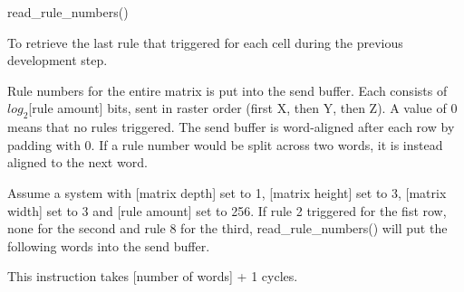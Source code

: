 

\format
read\_rule\_numbers()

\purpose

To retrieve the last rule that triggered for each cell during the previous development step.

\description

Rule numbers for the entire matrix is put into the send buffer.
Each consists of $log_2$[rule amount] bits, sent in raster order (first X, then Y, then Z).
A value of 0 means that no rules triggered.
The send buffer is word-aligned after each row by padding with 0.
If a rule number would be split across two words, it is instead aligned to the next word.

\example

Assume a system with [matrix depth] set to 1, [matrix height] set to 3, [matrix width] set to 3 and [rule amount] set to 256.
If rule 2 triggered for the fist row, none for the second and rule 8 for the third,
read\_rule\_numbers() will put the following words into the send buffer.


\notes

This instruction takes [number of words] + 1 cycles.


